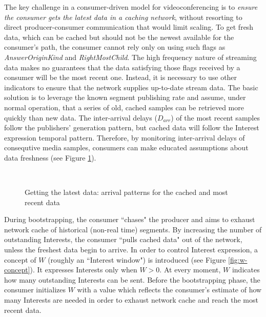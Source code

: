 \documentclass{icn/sig-alternate-2012} %
\begin{document}
The key challenge in a consumer-driven model for videoconferencing is to \emph{ensure the consumer gets the latest data in a caching network}, without resorting to direct producer-consumer communication that would limit scaling. To get fresh data, which can be cached but should not be the newest available for the consumer's path,  the consumer cannot rely only on using such flags as \textit{AnswerOriginKind} and \textit{RightMostChild}. The high frequency nature of streaming data makes no guarantees that the data satisfying those flags received by a consumer will be the most recent one. Instead, it is necessary to use other indicators to ensure that the network supplies up-to-date stream data. The basic solution is to leverage the known segment publishing rate and assume, under normal operation, that a series of old, cached samples can be retrieved more quickly than new data. The inter-arrival delays ($D_{arr}$) of the most recent samples follow the publishers' generation pattern, but cached data will follow the Interest expression temporal pattern. Therefore, by monitoring inter-arrival delays of consequtive media samples, consumers can make educated assumptions about data freshness (see Figure \ref{fig:inter-arrival}).

\begin{figure}[t!]
\centering

\\

\caption{Getting the latest data: arrival patterns for the cached and most recent data}
\label{fig:inter-arrival}
\end{figure}

During bootstrapping, the consumer ``chases" the producer and aims to exhaust network cache of historical (non-real time) segments. By increasing the number of outstanding Interests, the consumer ``pulls cached data" out of the network, unless the freshest data begin to arrive. In order to control Interest expression, a concept of $W$ (roughly an ``Interest window") is introduced (see Figure \ref{fig:w-concept}). It expresses Interests only when $W > 0$. At every moment, $W$ indicates how many outstanding Interests can be sent. Before the bootstrapping phase, the consumer initializes $W$ with a value which reflects the consumer's estimate of how many Interests are needed in order to exhaust network cache and reach the most recent data. 
\end{document}
